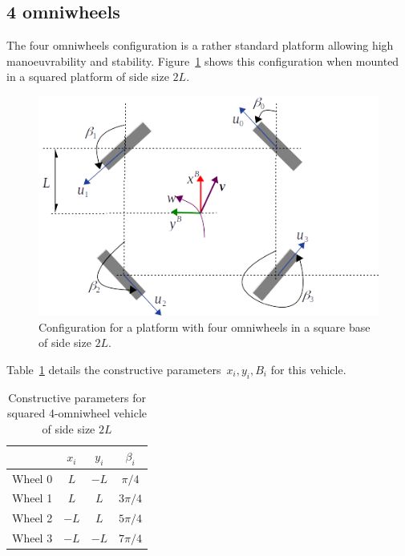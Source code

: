 \subsection{4 omniwheels}
The four omniwheels configuration is a rather standard platform allowing high manoeuvrability and stability. Figure~\ref{fig:four_omniwheels_kinematics} shows this configuration when mounted in a squared platform of side size $2L$.
\begin{figure}[bth!]
  \begin{center}
    \includegraphics[width=1.0\columnwidth]{figures/four_omniwheels_kinematics.png}
    \caption{Configuration for a platform with four omniwheels in a square base of side size $2L$.}
    \label{fig:four_omniwheels_kinematics}
  \end{center}
\end{figure}

Table~\ref{tab:params_4_omni} details the constructive parameters~$x_i,y_i,B_i$ for this vehicle. 
\begin{table}[hbt] \centering
\caption{Constructive parameters for squared 4-omniwheel vehicle of side size $2L$}
\begin{tabular}
[c]{|c|c|c|c|}\hline
		& $x_i$ 		& $y_i$				& $\beta_i$ \\\hline
Wheel 0 & $L$ 		    & $-L$				& $\pi/4$ \\\hline
Wheel 1 & $L$ 		    & $L$				& $3\pi/4$ \\\hline
Wheel 2 & $-L$ 		    & $L$				& $5\pi/4$ \\\hline
Wheel 3 & $-L$ 		    & $-L$				& $7\pi/4$ \\\hline
\end{tabular}
\label{tab:params_4_omni}
\end{table}

